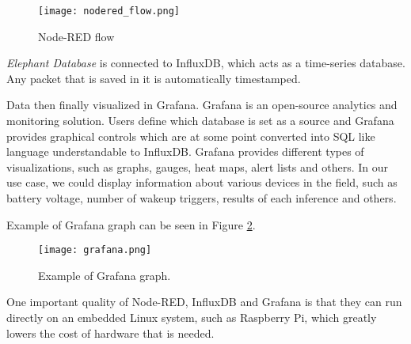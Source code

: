 \begin{figure}[ht]
    \centering
    \texttt{[image: nodered\_flow.png]} 
    \caption{ Node-RED flow}
    \label{nodered_flow}
\end{figure}

\textit{Elephant Database} is connected to InfluxDB, which acts as a time-series database.
Any packet that is saved in it is automatically timestamped.

Data then finally visualized in Grafana. 
Grafana is an open-source analytics and monitoring solution.
Users define which database is set as a source and Grafana provides graphical controls which are at some point converted into SQL like language understandable to InfluxDB.
Grafana provides different types of visualizations, such as graphs, gauges, heat maps, alert lists and others.
In our use case, we could display information about various devices in the field, such as battery voltage, number of wakeup triggers, results of each inference and others.

Example of Grafana graph can be seen in Figure \ref{grafana}.

\begin{figure}[ht]
    \centering
    \texttt{[image: grafana.png]} 
    \caption{ Example of Grafana graph.}
    \label{grafana}
\end{figure}

One important quality of Node-RED, InfluxDB and Grafana is that they can run directly on an embedded Linux system, such as Raspberry Pi, which greatly lowers the cost of hardware that is needed.
